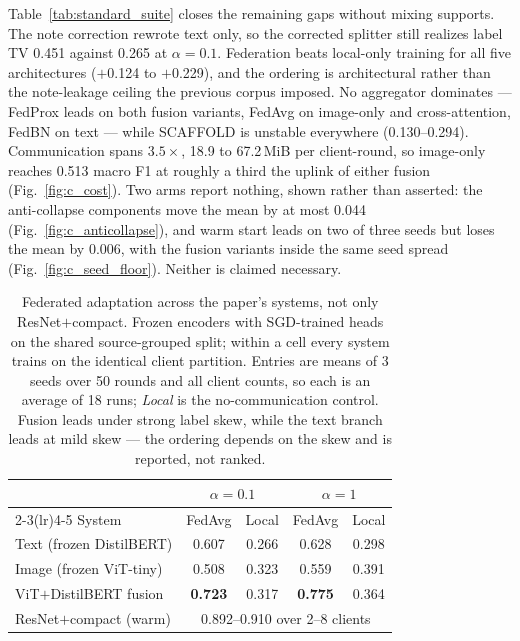 \documentclass[conference]{IEEEtran}
\begin{document}
Table~\ref{tab:standard_suite} closes the remaining gaps without mixing
supports. The note correction rewrote text only, so the corrected splitter
still realizes label TV 0.451 against 0.265 at $\alpha=0.1$. Federation beats local-only training for all five architectures ($+$0.124 to
$+$0.229), and the ordering is architectural rather than the note-leakage
ceiling the previous corpus imposed. No aggregator dominates --- FedProx leads on
both fusion variants, FedAvg on image-only and cross-attention, FedBN on text
--- while SCAFFOLD is unstable everywhere (0.130--0.294). Communication
spans $3.5\times$, 18.9 to 67.2\,MiB per client-round, so image-only reaches
0.513 macro F1 at roughly a third the uplink of either fusion
(Fig.~\ref{fig:c_cost}).
Two arms report nothing, shown rather than asserted: the anti-collapse
components move the mean by at most 0.044 (Fig.~\ref{fig:c_anticollapse}), and
warm start leads on two of three seeds but loses the mean by 0.006, with the
fusion variants inside the same seed spread (Fig.~\ref{fig:c_seed_floor}).
Neither is claimed necessary.


\begin{table}[t]
\caption{Federated adaptation across the paper's systems, not only ResNet$+$compact. Frozen encoders with SGD-trained heads on the shared source-grouped split; within a cell every system trains on the identical client partition. Entries are means of 3 seeds over 50 rounds and all client counts, so each is an average of 18 runs; \emph{Local} is the no-communication control. Fusion leads under strong label skew, while the text branch leads at mild skew --- the ordering depends on the skew and is reported, not ranked.}
\label{tab:all_systems_fed}
\centering\footnotesize
\setlength\tabcolsep{4.0pt}
\begin{tabular}{lcccc}
\toprule
& \multicolumn{2}{c}{$\alpha=0.1$} & \multicolumn{2}{c}{$\alpha=1$}\\
\cmidrule(lr){2-3}\cmidrule(lr){4-5}
System & FedAvg & Local & FedAvg & Local\\
\midrule
Text (frozen DistilBERT) & 0.607 & 0.266 & 0.628 & 0.298\\
Image (frozen ViT-tiny) & 0.508 & 0.323 & 0.559 & 0.391\\
ViT$+$DistilBERT fusion & \textbf{0.723} & 0.317 & \textbf{0.775} & 0.364\\
\midrule
ResNet$+$compact (warm) & \multicolumn{4}{c}{0.892--0.910 over 2--8 clients}\\
\bottomrule
\end{tabular}
\end{table}
\end{document}
